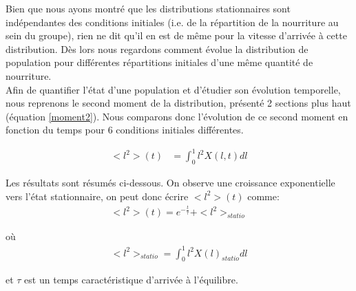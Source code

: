 Bien que nous ayons montré que les distributions stationnaires sont indépendantes des conditions initiales (i.e. de la répartition de la nourriture au sein du groupe), rien ne dit qu'il en est de même pour la vitesse d'arrivée à cette distribution. Dès lors nous regardons comment évolue la distribution de population pour différentes répartitions initiales d'une même quantité de nourriture.\\

Afin de quantifier l'état d'une population et d'étudier son évolution temporelle, nous reprenons le second moment de la distribution, présenté 2 sections plus haut (équation \ref{moment2}). Nous comparons donc l'évolution de ce second moment en fonction du temps pour 6 conditions initiales différentes. 

\begin{equation}
\begin{aligned}
<l^2>(t) &= \int_0^1 l^2 X(l,t) dl 
\end{aligned}
\label{moment2}
\end{equation}

Les résultats sont résumés ci-dessous. On observe une croissance exponentielle vers l'état stationnaire, on peut donc écrire $<l^2>(t)$ comme:
\begin{equation}
\begin{aligned}
<l^2>(t)=e^{-\frac{t}{\tau}}+<l^2>_{statio}
\end{aligned}
\end{equation}

où
\begin{equation}
\begin{aligned}
<l^2>_{statio}= \int_0^1 l^2 X(l)_{statio} dl
\end{aligned}
\end{equation}

et $\tau$ est un temps caractéristique d'arrivée à l'équilibre.